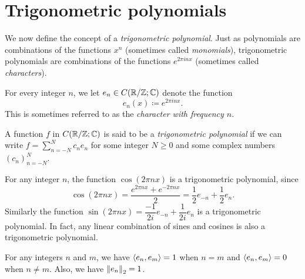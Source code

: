 \section{Trigonometric polynomials}\label{ii:sec:5.3}

\begin{note}
  We now define the concept of a \emph{trigonometric polynomial}.
  Just as polynomials are combinations of the functions \(x^n\) (sometimes called \emph{monomials}), trigonometric polynomials are combinations of the functions \(e^{2 \pi i n x}\) (sometimes called \emph{characters}).
\end{note}

\begin{defn}[Characters]\label{ii:5.3.1}
  For every integer \(n\), we let \(e_n \in C(\R / \Z ; \C)\) denote the function
  \[
    e_n(x) \coloneqq e^{2 \pi i n x}.
  \]
  This is sometimes referred to as the \emph{character with frequency \(n\)}.
\end{defn}

\begin{defn}\label{ii:5.3.2}
  A function \(f\) in \(C(\R / \Z ; \C)\) is said to be a \emph{trigonometric polynomial} if we can write
  \(f = \sum_{n = -N}^N c_n e_n\) for some integer \(N \geq 0\) and some complex numbers \((c_n)_{n = -N}^N\).
\end{defn}

\setcounter{thm}{3}
\begin{eg}\label{ii:5.3.4}
  For any integer \(n\), the function \(\cos(2 \pi n x)\) is a trigonometric polynomial, since
  \[
    \cos(2 \pi n x) = \dfrac{e^{2 \pi n x} + e^{- 2 \pi n x}}{2} = \dfrac{1}{2} e_{-n} + \dfrac{1}{2} e_n.
  \]
  Similarly the function \(\sin(2 \pi n x) = \dfrac{-1}{2i} e_{-n} + \dfrac{1}{2i} e_n\) is a trigonometric polynomial.
  In fact, any linear combination of sines and cosines is also a trigonometric polynomial.
\end{eg}

\begin{lem}\label{ii:5.3.5}
  For any integers \(n\) and \(m\), we have \(\inner*{e_n, e_m} = 1\) when \(n = m\) and \(\inner*{e_n, e_m} = 0\) when \(n \neq m\).
  Also, we have \(\norm*{e_n}_2 = 1\).
\end{lem}


